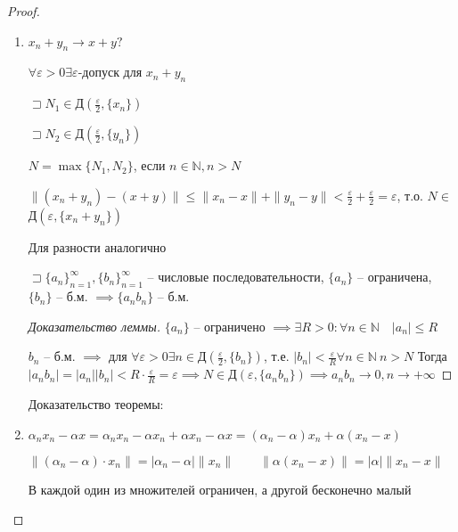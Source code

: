 \documentclass{book}
\newcommand\N{\ensuremath{\mathbb{N}}}
\theoremstyle{definition}
\begin{document}
    \begin{proof}
        \begin{enumerate}
            \item $x_{n} + y_{n} \to  x+y? $

                $\forall \varepsilon>0 \exists \varepsilon$-допуск для $x_{n} +y_{n} $

                $\sqsupset N_1\in $Д$(\frac{\varepsilon}{2}, \{x_{n} \})$

                $\sqsupset N_2\in$Д$\left( \frac{\varepsilon}{2}, \{y_{n} \} \right) $

                $N = \max\{N_1, N_2\}$, если $n\in \N , n>N$

                $\|(x_{n} +y_{n} ) - (x+y)\|\leqslant \|x_{n} -x\| + \|y_{n} -y\| <\frac{\varepsilon}{2} + \frac{\varepsilon}{2} = \varepsilon$, т.о. $N\in $Д$\left( \varepsilon, \{x_{n} + y_{n} \} \right) $

                Для разности аналогично

                \begin{lemma}
                    $\sqsupset \{a_n\}_{n=1}^{\infty }, \{b_n\}_{n=1}^{\infty }    $ -- числовые последовательности, $\{a_n\}$ -- ограничена, $\{b_n\}$ -- б.м. $\implies  \{a_nb_n\}$ -- б.м.
                \end{lemma}
                \begin{proof}
                    [Доказательство леммы]

                    $\{a_n\}$ -- ограничено $\implies \exists R>0: \forall n\in \N \quad |a_n| \leqslant R$

                    $b_n$ -- б.м. $\implies $ для $\forall \varepsilon>0 \exists n\in \text{Д}\left( \frac{\varepsilon}{2}, \{b_n\} \right) $, т.е. $|b_n|<\frac{\varepsilon}{R} \forall n\in \N  ~ n>N$ Тогда $|a_nb_n| = |a_n| |b_n| <R\cdot \frac{\varepsilon}{R} = \varepsilon \implies N\in \text{Д}\left( \varepsilon, \{a_nb_n\} \right) \implies a_nb_n \to 0, n\to  +\infty  $
                \end{proof}
            Доказательство теоремы:

        \item $\alpha_nx_n - \alpha x = \alpha_nx_n - \alpha x_n + \alpha x_n - \alpha x = (\alpha_n-\alpha)x_n + \alpha(x_n - x)$

            $\|(\alpha_n - \alpha)\cdot x_n\| = |\alpha_n - \alpha|\|x_n\|\qquad \|\alpha(x_n-x)\| = |\alpha|\|x_n-x\|$

            В каждой один из множителей ограничен, а другой бесконечно малый


\end{enumerate}
\end{proof}
\end{document}
